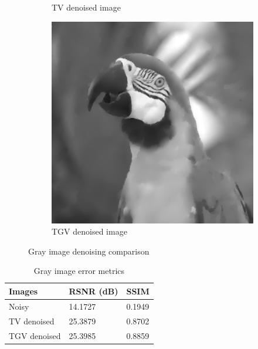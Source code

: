 \documentclass{article}
\begin{document}
\begin{figure}[htbp]
\begin{subfigure}[b]{0.24\textwidth}
        \caption{TV denoised image}
        \label{fig:TVdenoised_gray}
    \end{subfigure}
    \hfill
    \begin{subfigure}[b]{0.24\textwidth}
        \centering
        \includegraphics[width=\textwidth]{../images/TGVdenoised_gray.png}
        \caption{TGV denoised image}
        \label{fig:TGVdenoised_gray}
    \end{subfigure}
    \vspace{.3cm}

    \caption{Gray image denoising comparison}
    \label{fig:gray_comparison}
\end{figure}

\begin{table}[htbp]
    \centering
    \begin{tabular}{| l | l | l |} 
        \hline
        \textbf{Images} & \textbf{RSNR (dB)} & \textbf{SSIM} \\ [0.5ex] 
        \hline\hline
        Noisy & 14.1727 & 0.1949 \\ 
        \hline
        TV denoised & 25.3879 & 0.8702 \\
        \hline
        TGV denoised & 25.3985 & 0.8859 \\
        \hline
    \end{tabular}
    \caption{Gray image error metrics}
    \label{tab:gray_metrics}
\end{table}
\end{document}
